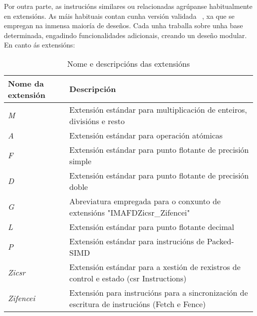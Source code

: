 Por outra parte, as instrucións similares ou relacionadas agrúpanse habitualmente en extensións. As máis habituais contan cunha versión validada ~\cite{ratified_extensions}, xa que se empregan na inmensa maioría de deseños. Cada unha traballa sobre unha base determinada, engadindo funcionalidades adicionais, creando un deseño modular. 
En canto ás extensións: 

\begin{table}[hp!]
  \centering
  \begin{tabular}{|p{5cm}|p{7cm}|}
    \rowcolor{udcpink!25}
    \textbf{Nome da extensión} & \textbf{Descripción} \\\hline
    \textit{M} & Extensión estándar para multiplicación de enteiros, divisións e resto \\
    \textit{A} & Extensión estándar para operación atómicas \\
    \textit{F} & Extensión estándar para punto flotante de precisión simple \\
    \textit{D} & Extensión estándar para punto flotante de precisión doble \\
    \textit{G} & Abreviatura empregada para o conxunto de extensións "IMAFDZicsr\_Zifencei" \\
    \textit{L} & Extensión estándar para punto flotante decimal \\
    \textit{P} & Extensión estándar para instrucións de Packed-SIMD \\
    \textit{Zicsr} & Extensión estándar para a xestión de rexistros de control e estado (\acrfull{csr} Instructions) \\
    \textit{Zifencei} &  Extensión para instrucións para a sincronización de escritura de instrucións (Fetch e Fence) \\
  \end{tabular}
  \caption{Nome e descripcións das extensións}
  \label{tab:extensiones}
\end{table}


